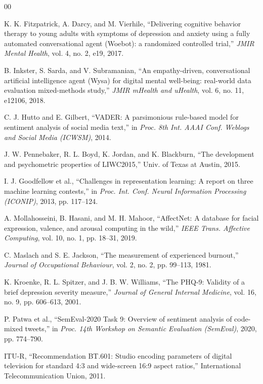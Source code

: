 \documentclass[conference]{IEEEtran}
\begin{document}
\begin{thebibliography}{00}

 K. K. Fitzpatrick, A. Darcy, and M. Vierhile, ``Delivering
cognitive behavior therapy to young adults with symptoms of depression and
anxiety using a fully automated conversational agent (Woebot): a randomized
controlled trial,'' \emph{JMIR Mental Health}, vol. 4, no. 2, e19, 2017.

 B. Inkster, S. Sarda, and V. Subramanian, ``An empathy-driven,
conversational artificial intelligence agent (Wysa) for digital mental
well-being: real-world data evaluation mixed-methods study,'' \emph{JMIR
mHealth and uHealth}, vol. 6, no. 11, e12106, 2018.

 C. J. Hutto and E. Gilbert, ``VADER: A parsimonious rule-based
model for sentiment analysis of social media text,'' in \emph{Proc. 8th Int.
AAAI Conf. Weblogs and Social Media (ICWSM)}, 2014.

 J. W. Pennebaker, R. L. Boyd, K. Jordan, and K. Blackburn,
``The development and psychometric properties of LIWC2015,'' Univ. of Texas at
Austin, 2015.

 I. J. Goodfellow et al., ``Challenges in representation
learning: A report on three machine learning contests,'' in \emph{Proc. Int.
Conf. Neural Information Processing (ICONIP)}, 2013, pp. 117--124.

 A. Mollahosseini, B. Hasani, and M. H. Mahoor,
``AffectNet: A database for facial expression, valence, and arousal computing
in the wild,'' \emph{IEEE Trans. Affective Computing}, vol. 10, no. 1, pp.
18--31, 2019.

 C. Maslach and S. E. Jackson, ``The measurement of
experienced burnout,'' \emph{Journal of Occupational Behaviour}, vol. 2, no. 2,
pp. 99--113, 1981.

 K. Kroenke, R. L. Spitzer, and J. B. W. Williams, ``The PHQ-9:
Validity of a brief depression severity measure,'' \emph{Journal of General
Internal Medicine}, vol. 16, no. 9, pp. 606--613, 2001.

 P. Patwa et al., ``SemEval-2020 Task 9: Overview of
sentiment analysis of code-mixed tweets,'' in \emph{Proc. 14th Workshop on
Semantic Evaluation (SemEval)}, 2020, pp. 774--790.

 ITU-R, ``Recommendation BT.601: Studio encoding parameters of
digital television for standard 4:3 and wide-screen 16:9 aspect ratios,''
International Telecommunication Union, 2011.


\end{thebibliography}
\end{document}
